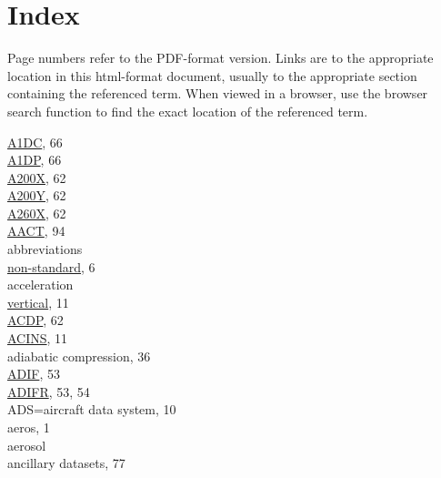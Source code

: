 \documentclass[
]{article}
\author{}
\date{\vspace{-2.5em}}
\begin{document}
\hypertarget{index}{%
\section{Index}\label{index}}

Page numbers refer to the PDF-format version. Links are to the
appropriate location in this html-format document, usually to the
appropriate section containing the referenced term. When viewed in a
browser, use the browser search function to find the exact location of
the referenced term. \twocolumn

\href{./5-cloud-physics-variables.html\#a1dc-a1dp}{A1DC}, 66\\
\href{./5-cloud-physics-variables.html\#a1dc-a1dp}{A1DP}, 66\\
\href{./5-cloud-physics-variables.html\#CRPC}{A200X}, 62\\
\href{./5-cloud-physics-variables.html\#CRPC}{A200Y}, 62\\
\href{./5-cloud-physics-variables.html\#CRPC}{A260X}, 62\\
\href{./10-obsolete-variables.html\#AACT}{AACT}, 94\\
abbreviations\\
\hspace*{0.333em}\hspace*{0.333em}\href{./2-general-information-about-data-files.html\#units-and-abbreviations}{non-standard},
6\\
acceleration\\
\hspace*{0.333em}\hspace*{0.333em}\href{./3-the-state-of-the-aircraft.html\#ACINS}{vertical},
11\\
\href{./5-cloud-physics-variables.html\#CRPC}{ACDP}, 62\\
\href{./3-the-state-of-the-aircraft.html\#ACINS}{ACINS}, 11\\
adiabatic compression, 36\\
\href{./4-the-state-of-the-atmosphere.html\#adifr}{ADIF}, 53\\
\href{./4-the-state-of-the-atmosphere.html\#adifr}{ADIFR}, 53, 54\\
ADS=aircraft data system, 10\\
aeros, 1\\
aerosol\\
\hspace*{0.333em}\hspace*{0.333em}ancillary datasets, 77\\
\end{document}
